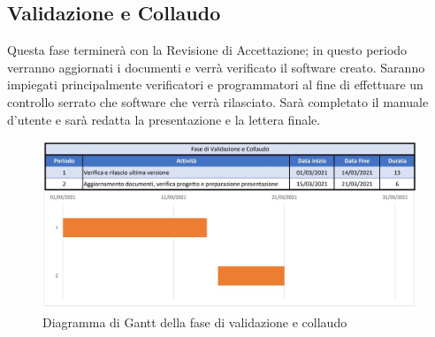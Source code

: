 \documentclass[../piano_di_progetto.tex]{subfiles}
\begin{document}
\subsection{Validazione e Collaudo}%
\label{sub:valid_coll}
Questa fase terminerà con la Revisione di Accettazione; in questo periodo verranno aggiornati i documenti e verrà verificato il software creato. Saranno impiegati principalmente verificatori e programmatori al fine di effettuare un controllo serrato che software che verrà rilasciato. Sarà completato il manuale d'utente e sarà redatta la presentazione e la lettera finale. 

\begin{figure}[H]
\centering
\includegraphics[width=12cm]{img/fase_valid_collaudo}
\caption{Diagramma di Gantt della fase di validazione e collaudo}
\end{figure}
\end{document}
